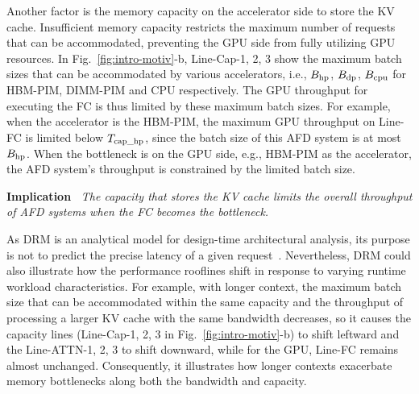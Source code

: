 Another factor is the memory capacity on the accelerator side to store the KV cache. 
Insufficient memory capacity restricts the maximum number of requests that can be accommodated, preventing the GPU side from fully utilizing GPU resources. 
In Fig.~\ref{fig:intro-motiv}-b, Line-Cap-1, 2, 3 show the maximum batch sizes that can be accommodated by various accelerators, i.e., $B_{\rm hp}$, $B_{\rm dp}$, $B_{\rm cpu}$ for HBM-PIM, DIMM-PIM and CPU respectively.
The GPU throughput for executing the FC is thus limited by these maximum batch sizes.
For example, when the accelerator is the HBM-PIM, the maximum GPU throughput on Line-FC is limited below $T_{\rm cap\_hp}$, since the batch size of this AFD system is at most $B_{\rm hp}$.
When the bottleneck is on the GPU side, e.g., HBM-PIM as the accelerator, the AFD system's throughput is constrained by the limited batch size.


\begin{mdframed}[backgroundcolor=gray!10,linecolor=black,linewidth=1pt]
\textbf{Implication~\uppercase\expandafter{}} 
\textit{The capacity that stores the KV cache limits the overall throughput of AFD systems when the FC becomes the bottleneck.
}
\end{mdframed}




As DRM is an analytical model for design-time architectural analysis, 
its purpose is not to predict the precise latency of a given request~\cite{stojkovic2025dynamoLLM,kakolyris2025throttllem}. 
Nevertheless, DRM could also illustrate how the performance rooflines shift in response to varying runtime workload characteristics.
For example, with longer context, the maximum batch size that can be accommodated within the same capacity and the throughput of processing a larger KV cache with the same bandwidth decreases, 
so it causes the capacity lines (Line-Cap-1, 2, 3 in Fig.~\ref{fig:intro-motiv}-b) to shift leftward and the Line-ATTN-1, 2, 3 to shift downward, 
while for the GPU, Line-FC remains almost unchanged. 
Consequently, it illustrates how longer contexts exacerbate memory bottlenecks along both the bandwidth and capacity.




